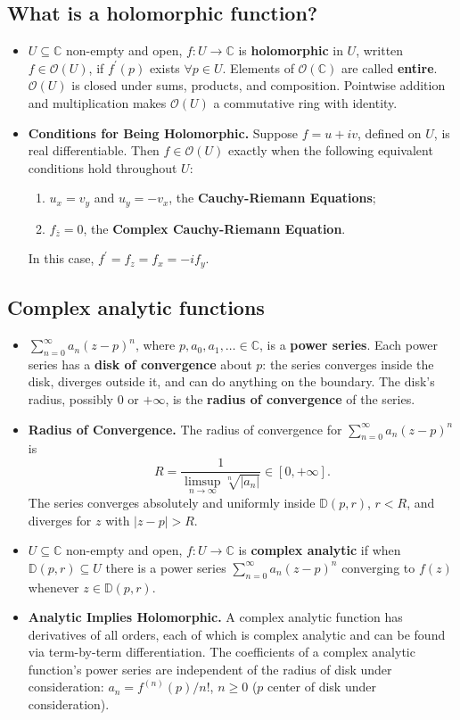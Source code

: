 \documentclass{article}
\newenvironment{topic}[1]{%
{\subsection{#1}}%
\begin{itemize}%
}{%
\end{itemize}%
}
\newcommand{\theorem}[1]{\item {\bf #1.}}
\newcommand{\term}[1]{{\bf #1}}
\newcommand{\holo}[1]{\mathcal{O}(#1)}
\newcommand{\remark}{\item}
\newcommand{\entire}{\holo{\mathbb{C}}}
\newcommand{\disk}[2]{\mathbb{D}(#1, #2)}
\begin{document}
\begin{topic}{What is a holomorphic function?}
\remark $U \subseteq \mathbb{C}$ non-empty and open, $f : U \to \mathbb{C}$ is \term{holomorphic} in $U$, written $f \in \holo{U}$, if $f^\prime(p)$ exists $\forall p \in U$. Elements of $\entire{}$ are called \term{entire}. $\holo{U}$ is closed under sums, products, and composition. Pointwise addition and multiplication makes $\holo{U}$ a commutative ring with identity.

\theorem{Conditions for Being Holomorphic} Suppose $f = u + iv$, defined on $U$, is real differentiable. Then $f \in \holo{U}$ exactly when the following equivalent conditions hold throughout $U$:
\begin{enumerate}
\item $u_x = v_y$ and $u_y = -v_x$, the \term{Cauchy-Riemann Equations};
\item $f_{\overline{z}} = 0$, the \term{Complex Cauchy-Riemann Equation}.
\end{enumerate}
In this case, $f^\prime = f_z = f_x = -if_y$.

\end{topic}


\begin{topic}{Complex analytic functions}

\remark $\sum_{n=0}^\infty a_n (z - p)^n$, where $p, a_0, a_1, \ldots \in \mathbb{C}$, is a \term{power series}. Each power series has a \term{disk of convergence} about $p$: the series converges inside the disk, diverges outside it, and can do anything on the boundary. The disk's radius, possibly $0$ or $+\infty$, is the \term{radius of convergence} of the series.

\theorem{Radius of Convergence} The radius of convergence for $\sum_{n=0}^\infty a_n (z - p)^n$ is $$R = \dfrac{1}{\limsup_{n \to \infty} \sqrt[n]{|a_n|}} \in [0, +\infty].$$ The series converges absolutely and uniformly inside $\disk{p}{r}$, $r < R$, and diverges for $z$ with $|z - p| > R$.

\remark $U \subseteq \mathbb{C}$ non-empty and open, $f : U \to \mathbb{C}$ is \term{complex analytic} if when $\disk{p}{r} \subseteq U$ there is a power series $\sum_{n=0}^\infty a_n (z - p)^n$ converging to $f(z)$ whenever $z \in \disk{p}{r}$.

\theorem{Analytic Implies Holomorphic} A complex analytic function has derivatives of all orders, each of which is complex analytic and can be found via term-by-term differentiation. The coefficients of a complex analytic function's power series are independent of the radius of disk under consideration: $a_n = f^{(n)}(p) / n!$, $n \geq 0$ ($p$ center of disk under consideration).

\end{topic}
\end{document}
